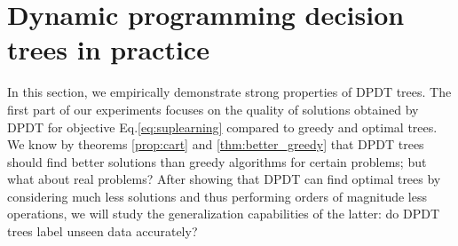 \chapter{Dynamic programming decision trees in practice}\label{sec:exps-dt}

In this section, we empirically demonstrate strong properties of DPDT trees. 
The first part of our experiments focuses on the quality of solutions obtained by DPDT for objective Eq.\ref{eq:suplearning} compared to greedy and optimal trees. We know by theorems \ref{prop:cart} and \ref{thm:better_greedy} that DPDT trees should find better solutions than greedy algorithms for certain problems; but what about real problems?
After showing that DPDT can find optimal trees by considering much less solutions and thus performing orders of magnitude less operations, we will study the generalization capabilities of the latter: do DPDT trees label unseen data accurately?

